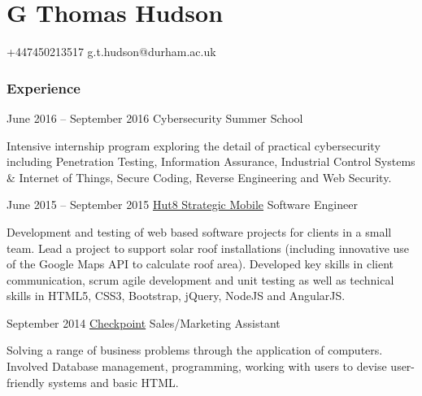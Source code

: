 \documentclass{tccv}
\begin{document}
\part{G Thomas Hudson}

    {+447450213517}
    {g.t.hudson@durham.ac.uk}

\section{Experience}

\begin{eventlist}

\item{June 2016 -- September 2016}
     {}
     {Cybersecurity Summer School}

Intensive internship program exploring the detail of practical cybersecurity including Penetration Testing, Information Assurance, Industrial Control Systems \& Internet of Things, Secure Coding, Reverse Engineering and Web Security.

\item{June 2015 -- September 2015}
     {\href{http://www.hut8strategicmobile.com}{Hut8 Strategic Mobile}}
     {Software Engineer}

Development and testing of web based software projects for clients in a small team. Lead a project to support solar roof installations (including innovative use of the Google Maps API to calculate roof area). Developed key skills in client communication, scrum agile development and unit testing as well as technical skills in HTML5, CSS3, Bootstrap, jQuery, NodeJS and AngularJS.

\item{September 2014}
     {\href{http://checkpoint-safety.com/}{Checkpoint}}
     {Sales/Marketing Assistant }

Solving a range of business problems through the application of  computers. Involved Database management, programming, working with users to devise user-friendly systems and basic HTML.



\end{eventlist}
\end{document}
